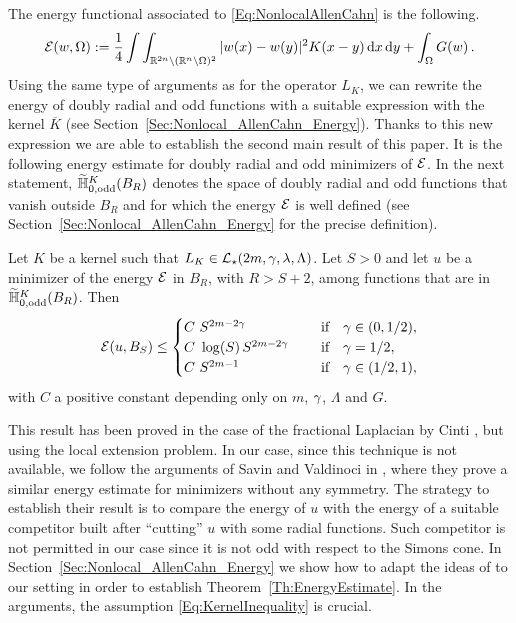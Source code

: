 
The energy functional associated to \eqref{Eq:NonlocalAllenCahn} is the following.
\begin{equation}
\label{Eq:Energy}
\mathcal{E}(w, \Omega) := \dfrac{1}{4}\int\int_{\mathbb{R}^{2n} \setminus (\mathbb{R}^n\setminus\Omega)^2} |w(x) - w(y)|^2 K(x-y) \,\mathrm{d} x \,\mathrm{d} y + \int_{\Omega} G(w)\,.
\end{equation}
Using the same type of arguments as for the operator $L_K$, we can rewrite the energy of doubly radial and odd functions with a suitable expression with the kernel $\overline{K}$ (see Section~\ref{Sec:Nonlocal_AllenCahn_Energy}). Thanks to this new expression we are able to establish the second main result of this paper. It is the following energy estimate for doubly radial and odd minimizers of $\mathcal{E}$. In the next statement, $\widetilde{\mathbb{H}}^K_{0, \mathrm{odd}}(B_R)$ denotes the space of doubly radial and odd functions that vanish outside $B_R$ and for which the energy $\mathcal{E}$ is well defined (see Section~\ref{Sec:Nonlocal_AllenCahn_Energy} for the precise definition).

\begin{theorem}
	\label{Th:EnergyEstimate} 
	Let $K$ be a kernel such that $L_K\in \mathcal{L}_\star(2m, \gamma, \lambda, \Lambda)$. Let $S>0$ and let $u$ be a minimizer of the energy $\mathcal{E}$ in $B_{R}$, with $R>S+2$, among functions that are in $\widetilde{\mathbb{H}}^K_{0, \mathrm{odd}}(B_R)$. Then
	$$ \mathcal{E} (u,B_S) \leq \begin{cases}
	C \ S^{2m-2\gamma}\ \ \ \ &\textrm{if } \ \ \gamma\in(0,1/2),\\
	C\ \log(S)\,S^{2m-2\gamma}\ \ \ \ &\textrm{if } \ \ \gamma=1/2,\\
	C \ S^{2m-1}\ \ \ \ &\textrm{if } \ \ \gamma\in(1/2,1),\\
	\end{cases} $$
	with $C$ a positive constant depending only on $m$, $\gamma$, $\Lambda$ and $G$.
\end{theorem}



This result has been proved in the case of the fractional Laplacian by Cinti \cite{Cinti-Saddle,Cinti-Saddle2}, but using the local extension problem. In our case, since this technique is not available, we follow the arguments of Savin and Valdinoci in \cite{SavinValdinoci-EnergyEstimate}, where they prove a similar energy estimate for minimizers without any symmetry. The strategy to establish their result is to compare the energy of $u$ with the energy of a suitable competitor built after ``cutting'' $u$ with some radial functions. Such competitor is not permitted in our case since it is not odd with respect to the Simons cone. In Section~\ref{Sec:Nonlocal_AllenCahn_Energy} we show how to adapt the ideas of \cite{SavinValdinoci-EnergyEstimate} to our setting in order to establish Theorem~\ref{Th:EnergyEstimate}. In the arguments, the assumption \eqref{Eq:KernelInequality} is crucial.




